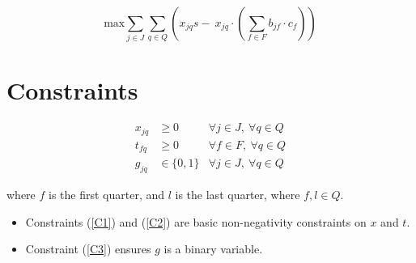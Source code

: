 \documentclass[a4paper]{article}
\newcommand{\SET}[1]{\{ {#1} \}}
\begin{document}
\[
\text{max} \sum_{j \in J}\sum_{q \in Q} (x_{jq} s -\: x_{jq} \cdot (\sum_{f \in F} b_{jf} \cdot c_f))
\]


\section*{Constraints}

\begin{align}
x_{jq} & \geq 0 & \forall j \in J,\  \forall q \in Q \label{C1}\\
t_{fq} & \geq 0 & \forall f \in F,\  \forall q \in Q \label{C2}\\
g_{jq} & \in \SET{0, 1} & \forall j \in J,\ \forall q \in Q \label{C3}
\end{align}

where $f$ is the first quarter, and $l$ is the last quarter, where $f, l \in Q$.
\begin{itemize}
    \item Constraints (\ref{C1}) and (\ref{C2}) are basic non-negativity constraints on $x$ and $t$. 
    \item Constraint (\ref{C3}) ensures $g$ is a binary variable.
\end{itemize}
\end{document}
